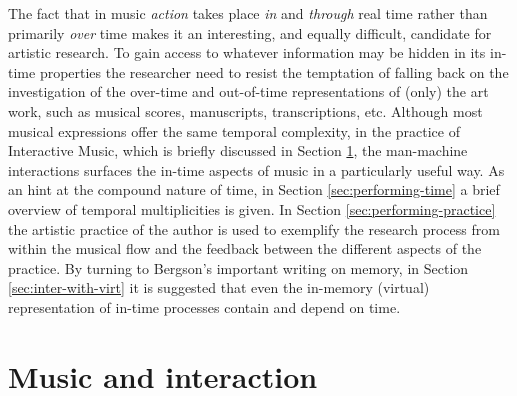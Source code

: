 The fact that in music \emph{action} takes place \emph{in} and \emph{through} real time rather than primarily \emph{over} time makes it an interesting, and equally difficult, candidate for artistic research. To gain access to whatever information may be hidden in its in-time properties the researcher need to resist the temptation of falling back on the investigation of the over-time and out-of-time representations of (only) the art work, such as musical scores, manuscripts, transcriptions, etc. Although most musical expressions offer the same temporal complexity, in the practice of Interactive Music, which is briefly discussed in Section \ref{sec:why-interaction}, the man-machine interactions surfaces the in-time aspects of music in a particularly useful way. As an hint at the compound nature of time, in Section \ref{sec:performing-time} a brief overview of temporal multiplicities is given.
In Section \ref{sec:performing-practice} the artistic practice of the author is used to exemplify the research process from within the musical flow and the feedback between the different aspects of the practice. By turning to Bergson's important writing on memory, in Section \ref{sec:inter-with-virt} it is suggested that even the in-memory (virtual) representation of in-time processes contain and depend on time.

\section{Music and interaction}
\label{sec:why-interaction}

